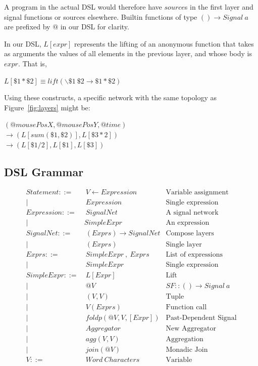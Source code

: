 \documentclass[twocolumn,11pt,english]{article}
\begin{document}
A program in the actual DSL would therefore have $source$s in the first layer and signal functions or sources elsewhere. Builtin functions of type $() \rightarrow Signal~a$ are prefixed by $@$ in our DSL for clarity. 

In our DSL, $L[expr]$ represents the lifting of an anonymous function that takes as arguments the values of all elements in the previous layer, and whose body is $expr$. That is, 
\begin{center}
$L[\$1 * \$2] \equiv lift (\backslash \$1 ~\$2 \rightarrow \$1 * \$2)$
\end{center}
Using these constructs, a specific network with the same topology as Figure~\ref{fig:layers} might be:
\begin{center}
$(@mousePosX, @mousePosY, @time)$
\\ $\rightarrow (L[sum(\$1, \$2)], L[\$3 * 2])$
\\ $\rightarrow (L[\$1 / 2], L[\$1], L[\$3])$
\end{center}
\subsection{DSL Grammar}
\footnotesize
\begin{align*}
  Statement ::=& ~V \leftarrow Expression &\text{Variable assignment}\\
  |& ~Expression &\text{Single expression}\\
  Expression ::=& ~SignalNet &\text{A signal network}\\
  |& SimpleExpr &\text{An expression}\\
  SignalNet ::=& ~( Exprs ) \rightarrow SignalNet &\text{Compose layers}\\
   |& ~(Exprs ) &\text{Single layer} \\
  Exprs ::=& ~SimpleExpr ~,~ Exprs &\text{List of expressions}\\
  |& ~SimpleExpr &\text{Single expression}\\
  SimpleExpr ::=& ~L[Expr] &\text{Lift}\\
  |& ~ @V &\text{$SF :: () \rightarrow Signal~a$}\\
  |& ~ (V, V) &\text{Tuple}\\
  |& ~ V( Exprs ) &\text{Function call}\\
  |& ~ foldp( @V, V, [Expr] ) &\text{Past-Dependent Signal}\\
  |& ~ Aggregator &\text{New Aggregator}\\
  |& ~ agg(V, V)&\text{Aggregation}\\
  |& ~ join(@V)&\text{Monadic Join}\\
  V ::=& ~Word~Characters &\text{Variable}
\end{align*}
\normalsize
\end{document}

